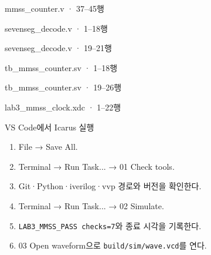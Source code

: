 \begin{frame}[fragile]{mmss\_counter.v · 37–45행}

\end{frame}

\begin{frame}[fragile]{sevenseg\_decode.v · 1–18행}

\end{frame}

\begin{frame}[fragile]{sevenseg\_decode.v · 19–21행}

\end{frame}

\begin{frame}[fragile]{tb\_mmss\_counter.sv · 1–18행}

\end{frame}

\begin{frame}[fragile]{tb\_mmss\_counter.sv · 19–26행}

\end{frame}

\begin{frame}[fragile]{lab3\_mmss\_clock.xdc · 1–22행}

\end{frame}


\begin{frame}[label=simulate]{VS Code에서 Icarus 실행}
\small
\begin{enumerate}
\item File → Save All.
\item Terminal → Run Task... → 01 Check tools.
\item Git·Python·iverilog·vvp 경로와 버전을 확인한다.
\item Terminal → Run Task... → 02 Simulate.
\item \texttt{LAB3\_MMSS\_PASS checks=7}와 종료 시각을 기록한다.
\item 03 Open waveform으로 \texttt{build/sim/wave.vcd}를 연다.
\end{enumerate}
\end{frame}

